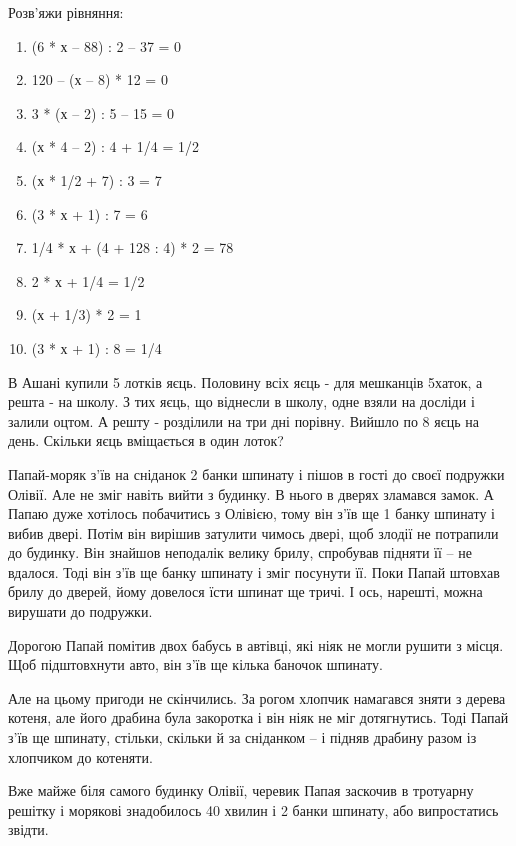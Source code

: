 \problem
Розв’яжи рівняння:
\begin{multicols}{2}
    \begin{enumerate}
        \item (6 * х – 88) : 2 – 37 = 0
        \item 120 – (х – 8) * 12 = 0
        \item 3 * (х – 2) : 5 – 15 = 0
        \item (х * 4 – 2) : 4 + 1/4 = 1/2
        \item (х * 1/2 + 7) : 3 = 7
        \item (3 * х + 1) : 7 = 6
        \item 1/4 * х + (4 + 128 : 4) * 2 = 78
        \item 2 * х + 1/4 = 1/2 
        \item (х + 1/3) * 2 = 1
        \item (3 * х + 1) : 8 = 1/4
    \end{enumerate}
\end{multicols}


\problem
В Ашані купили 5 лотків яєць.
Половину всіх яєць - для мешканців 5хаток, а решта - на школу.
З тих яєць, що віднесли в школу, одне взяли на досліди і залили оцтом.
А решту - розділили на три дні порівну. Вийшло по 8 яєць на день.
Скільки яєць вміщається в один лоток? 


\problem
Папай-моряк з’їв на сніданок 2 банки шпинату і пішов в гості до своєї
подружки Олівії. Але не зміг навіть вийти з будинку. В нього в дверях
зламався замок. А Папаю дуже хотілось побачитись з Олівією, тому він
з’їв ще 1 банку шпинату і вибив двері. Потім він вирішив затулити
чимось двері, щоб злодії не потрапили до будинку. Він знайшов неподалік
велику брилу, спробував підняти її – не вдалося. Тоді він з’їв ще банку
шпинату і зміг посунути її. Поки Папай штовхав брилу до дверей, йому
довелося їсти шпинат ще тричі. І ось, нарешті, можна вирушати до подружки.

Дорогою Папай помітив двох бабусь в автівці, які ніяк не могли рушити
з місця. Щоб підштовхнути авто, він з’їв ще кілька баночок шпинату.

Але на цьому пригоди не скінчились. За рогом хлопчик намагався зняти
з дерева котеня, але його драбина була закоротка і він ніяк не міг
дотягнутись. Тоді Папай з’їв ще шпинату, стільки, скільки й
за сніданком – і підняв драбину разом із хлопчиком до котеняти.

Вже майже біля самого будинку Олівії, черевик Папая заскочив в тротуарну
решітку і морякові знадобилось 40 хвилин і 2 банки шпинату,
або випростатись звідти.

